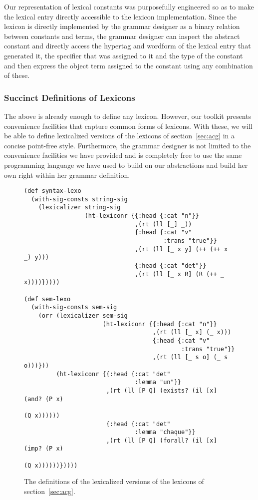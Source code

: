 Our representation of lexical constants was purposefully engineered so
as to make the lexical entry directly accessible to the lexicon
implementation. Since the lexicon is directly implemented by the grammar
designer as a binary relation between constants and terms, the grammar
designer can inspect the abstract constant and directly access the
hypertag and wordform of the lexical entry that generated it, the
specifier that was assigned to it and the type of the constant and then
express the object term assigned to the constant using any combination
of these.

\subsubsection{Succinct Definitions of Lexicons}

The above is already enough to define any lexicon. However, our toolkit
presents convenience facilities that capture common forms of
lexicons. With these, we will be able to define lexicalized versions of
the lexicons of section~\ref{sec:acg} in a concise point-free
style. Furthermore, the grammar designer is not limited to the convenience
facilities we have provided and is completely free to use the same
programming language we have used to build on our abstractions and build
her own right within her grammar definition.

\begin{figure}
  \centering
\begin{verbatim}
(def syntax-lexo
  (with-sig-consts string-sig
    (lexicalizer string-sig
                 (ht-lexiconr {{:head {:cat "n"}}
                               ,(rt (ll [_] _))
                               {:head {:cat "v"
                                       :trans "true"}}
                               ,(rt (ll [_ x y] (++ (++ x _) y)))
                               {:head {:cat "det"}}
                               ,(rt (ll [_ x R] (R (++ _ x))))}))))

(def sem-lexo
  (with-sig-consts sem-sig
    (orr (lexicalizer sem-sig
                      (ht-lexiconr {{:head {:cat "n"}}
                                    ,(rt (ll [_ x] (_ x)))
                                    {:head {:cat "v"
                                            :trans "true"}}
                                    ,(rt (ll [_ s o] (_ s o)))}))
         (ht-lexiconr {{:head {:cat "det"
                               :lemma "un"}}
                       ,(rt (ll [P Q] (exists? (il [x] (and? (P x)
                                                             (Q x))))))
                       {:head {:cat "det"
                               :lemma "chaque"}}
                       ,(rt (ll [P Q] (forall? (il [x] (imp? (P x)
                                                             (Q x))))))}))))
\end{verbatim}
  \caption{\label{fig:lex-impl} The definitions of the lexicalized
    versions of the lexicons of section~\ref{sec:acg}.}
\end{figure}


